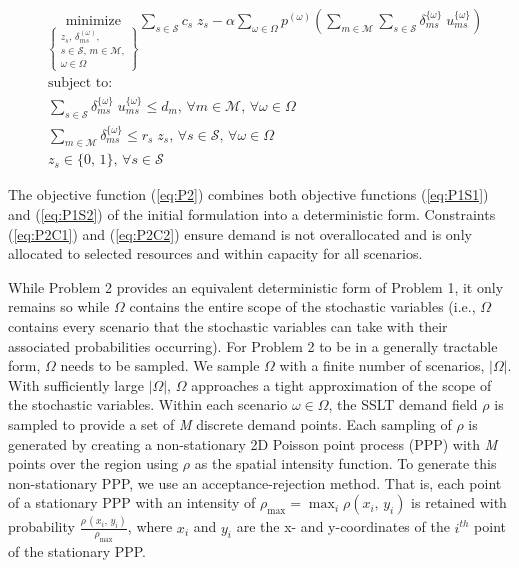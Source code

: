 \documentclass[onecolumn,draftcls]{IEEEtran}
\begin{document}
\vspace{5mm}
\begin{tcolorbox}[title = Problem 2 (Deterministic Equivalent Program of Problem 1)]
\begin{align}
& 
\underset{\left\{ \substack{
	z_s,\, \delta_{ms}^{(\omega)},\\
	s \in \mathcal{S},\, m \in \mathcal{M},\\
	\omega \in \Omega} \right\}} {\text{minimize}}
\sum_{s \in \mathcal{S}} c_s \; z_s - \alpha \sum_{\omega \in \Omega} p^{(\omega)} \left( \sum_{m \in \mathcal{M}} \sum_{s \in \mathcal{S}} \delta_{ms}^{\{\omega\}} \; u_{ms}^{\{\omega\}} \right) \label{eq:P2}\\
& \text{subject to:}  \nonumber \\
& \sum_{s \in \mathcal{S}} \delta_{ms}^{\{\omega\}} \; u_{ms}^{\{\omega\}} \leq d_m,\, \forall m \in \mathcal{M},\, \forall \omega \in \Omega \label{eq:P2C1}\\
& \sum_{m \in \mathcal{M}} \delta_{ms}^{\{\omega\}} \leq r_s \; z_s,\, \forall s \in \mathcal{S},\, \forall \omega \in \Omega \label{eq:P2C2}\\
& z_s \in \{0,\, 1\},\, \forall s \in \mathcal{S} \label{eq:P2C3}
\end{align}
\end{tcolorbox}

The objective function (\ref{eq:P2}) combines both objective functions (\ref{eq:P1S1}) and (\ref{eq:P1S2}) of the initial formulation into a deterministic form.  Constraints (\ref{eq:P2C1}) and (\ref{eq:P2C2})	ensure demand is not overallocated and is only allocated to selected resources and within capacity for all scenarios.

While Problem 2 provides an equivalent deterministic form of Problem 1, it only remains so while $\Omega$ contains the entire scope of the stochastic variables (i.e., $\Omega$ contains every scenario that the stochastic variables can take with their associated probabilities occurring).  For Problem 2 to be in a generally tractable form, $\Omega$ needs to be sampled.  We sample $\Omega$ with a finite number of scenarios, $|\Omega|$.  With sufficiently large $|\Omega|$, $\Omega$ approaches a tight approximation of the scope of the stochastic variables.  Within each scenario $\omega \in \Omega$, the SSLT demand field $\rho$ is sampled to provide a set of \textit{M} discrete demand points.  Each sampling of $\rho$ is generated by creating a non-stationary 2D Poisson point process (PPP) with \textit{M} points over the region using $\rho$ as the spatial intensity function.  To generate this non-stationary PPP, we use an acceptance-rejection method.  That is, each point of a stationary PPP with an intensity of $\rho_{\max} = \max_i\rho\left(x_i,\, y_i\right)$ is retained with probability $\frac{\rho\,\left(x_i,\, y_i\right)}{\rho_{\max}}$, where $x_i$ and $y_i$ are the x- and y-coordinates of the $i^{th}$ point of the stationary PPP.
\end{document}
